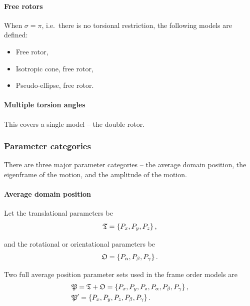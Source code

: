 \paragraph{Free rotors}

When $\sigma = \pi$, i.e.\ there is no torsional restriction, the following models are defined:
\begin{itemize}
    \item Free rotor,
    \item Isotropic cone, free rotor,
    \item Pseudo-ellipse, free rotor.
\end{itemize}


\paragraph{Multiple torsion angles}

This covers a single model -- the double rotor.


\subsubsection{Parameter categories}

There are three major parameter categories -- the average domain position, the eigenframe of the motion, and the amplitude of the motion.


\paragraph{Average domain position}

Let the translational parameters be
\begin{equation}
    \mathfrak{T} = \left\{ P_x, P_y, P_z \right\},
\end{equation}

and the rotational or orientational parameters be
\begin{equation}
    \mathfrak{O} = \left\{ P_\alpha, P_\beta, P_\gamma \right\}.
\end{equation}

Two full average position parameter sets used in the frame order models are
\begin{subequations}
\begin{align}
    &\mathfrak{P} = \mathfrak{T} + \mathfrak{O} = \left\{ P_x, P_y, P_z, P_\alpha, P_\beta, P_\gamma \right\}, \\
    &\mathfrak{P}' = \left\{ P_x, P_y, P_z, P_\beta, P_\gamma \right\}.
\end{align}
\end{subequations}


